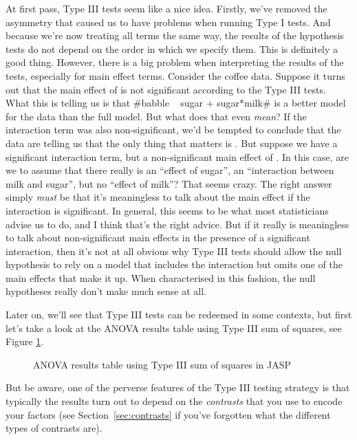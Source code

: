 At first pass, Type III tests seem like a nice idea. Firstly, we've removed the asymmetry that caused us to have problems when running Type I tests. And because we're now treating all terms the same way, the results of the hypothesis tests do not depend on the order in which we specify them. This is definitely a good thing. However, there is a big problem when interpreting the results of the tests, especially for main effect terms. Consider the coffee data. Suppose it turns out that the main effect of  is not significant according to the Type III tests. What this is telling us is that \rtextverb#babble ~ sugar + sugar*milk# is a better model for the data than the full model. But what does that even {\it mean}? If the interaction term  was also non-significant, we'd be tempted to conclude that the data are telling us that the only thing that matters is . But suppose we have a significant interaction term, but a non-significant main effect of . In this case, are we to assume that there really is an ``effect of sugar'', an ``interaction between milk and sugar'', but no ``effect of milk''? That seems crazy. The right answer simply {\it must} be that it's meaningless to talk about the main effect if the interaction is significant. In general, this seems to be what most statisticians advise us to do, and I think that's the right advice. But if it really is meaningless to talk about non-significant main effects in the presence of a significant interaction, then it's not at all obvious why Type III tests should allow the null hypothesis to rely on a model that includes the interaction but omits one of the main effects that make it up. When characterised in this fashion, the null hypotheses really don't make much sense at all. 

Later on, we'll see that Type III tests can be redeemed in some contexts, but first let's take a look at the ANOVA results table using Type III sum of squares, see Figure \ref{fig:factorialanova18}.

\begin{figure}[!htb]
\begin{center}
\caption{ANOVA results table using Type III sum of squares in JASP}
\label{fig:factorialanova18}
\HR
\end{center}
\end{figure}

But be aware, one of the perverse features of the Type III testing strategy is that typically the results turn out to depend on the {\it contrasts} that you use to encode your factors (see Section~\ref{sec:contrasts} if you've forgotten what the different types of contrasts are).

